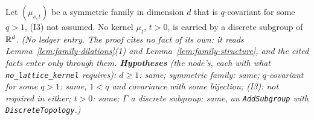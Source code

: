 \begin{proposition}
\label{prop:no-lattice-kernel}
\leanok
Let $(\mu_{s,t})$ be a symmetric family in dimension $d$ that is $q$-covariant for some $q > 1$,
(I3) not assumed. No kernel $\mu_t$, $t > 0$, is carried by a discrete subgroup of $\mathbb{R}^d$.
\statusT\quad\emph{(No ledger entry. The proof cites no fact of its own: it reads
Lemma~\ref{lem:family-dilations}(1) and Lemma~\ref{lem:family-structure}, and the cited facts
enter only through them. \textbf{Hypotheses} (the node's, each with what
\texttt{no\_lattice\_kernel} requires): $d \ge 1$: same; symmetric family: same; $q$-covariant for
some $q > 1$: same, $1 < q$ and covariance with some bijection; (I3): not required in either; $t > 0$:
same; $\Gamma$ a discrete subgroup: same, an \texttt{AddSubgroup} with \texttt{DiscreteTopology}.)}
\end{proposition}

